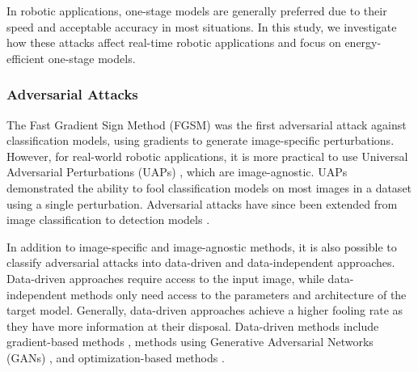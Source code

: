 

In robotic applications, one-stage models are generally preferred due to their speed and acceptable accuracy in most situations. In this study, we investigate how these attacks affect real-time robotic applications and focus on energy-efficient one-stage models.



\subsubsection{Adversarial Attacks}

The Fast Gradient Sign Method (FGSM) \citep{GoodfellowSS14} was the first adversarial attack against classification models, using gradients to generate image-specific perturbations. However, for real-world robotic applications, it is more practical to use Universal Adversarial Perturbations (UAPs) \citep{moosavi2017universal}, which are image-agnostic. UAPs demonstrated the ability to fool classification models on most images in a dataset using a single perturbation. Adversarial attacks have since been extended from image classification to detection models \citep{gurbaxani2018traits}.

In addition to image-specific and image-agnostic methods, it is also possible to classify adversarial attacks into data-driven and data-independent approaches. Data-driven approaches require access to the input image, while data-independent methods only need access to the parameters and architecture of the target model. Generally, data-driven approaches achieve a higher fooling rate as they have more information at their disposal. Data-driven methods include gradient-based methods \citep{chow2020adversarial,li2021universal,mohamad2021, xie2017adversarial}, methods using Generative Adversarial Networks (GANs) \citep{hashemi2020transferable,Wei2019}, and optimization-based methods \citep{carlini2017towards,liao2021transferable}. 

